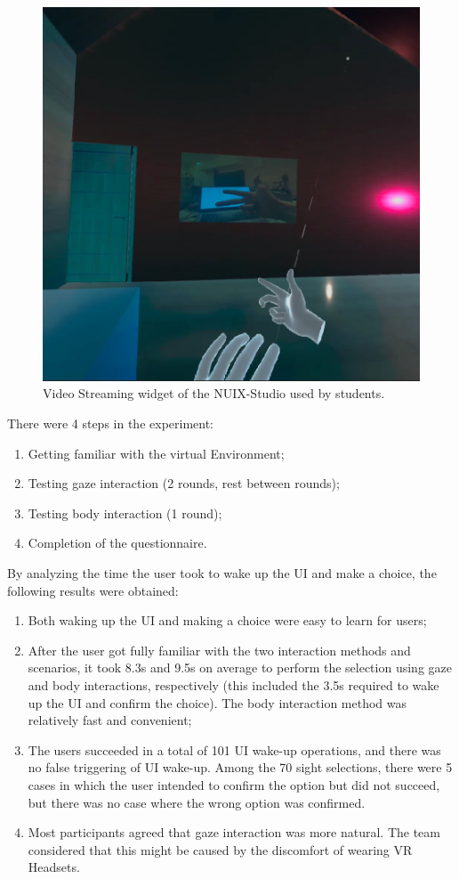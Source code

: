 \begin{figure}
  \centering
  \includegraphics[width=0.6\linewidth]{figures/VideoStreamingWidget.png}
  \caption{Video Streaming widget of the NUIX-Studio used by students.}
  \label{fig:VideoStreamingWidget-figure}
\end{figure}

There were 4 steps in the experiment:
\begin{enumerate}
    \item Getting familiar with the virtual Environment;
    \item Testing gaze interaction (2 rounds, rest between rounds);
    \item Testing body interaction (1 round);
    \item Completion of the questionnaire.
\end{enumerate}

By analyzing the time the user took to wake up the UI and make a choice, the following results were obtained:
\begin{enumerate}
    \item Both waking up the UI and making a choice were easy to learn for users;
    \item After the user got fully familiar with the two interaction methods and scenarios, it took 8.3s and 9.5s on average to perform the selection using gaze and body interactions, respectively (this included the 3.5s required to wake up the UI and confirm the choice). The body interaction method was relatively fast and convenient;
    \item The users succeeded in a total of 101 UI wake-up operations, and there was no false triggering of UI wake-up. Among the 70 sight selections, there were 5 cases in which the user intended to confirm the option but did not succeed, but there was no case where the wrong option was confirmed. 
    \item Most participants agreed that gaze interaction was more natural. The team considered that this might be caused by the discomfort of wearing VR Headsets.
\end{enumerate}

